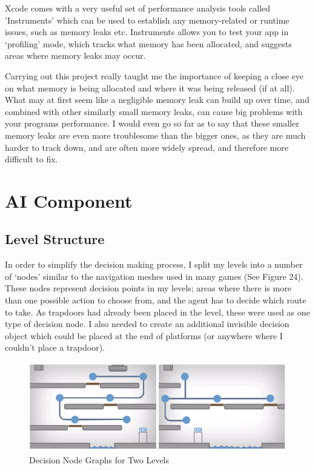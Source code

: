 \documentclass[a4paper,oneside]{report}
\begin{document}
Xcode comes with a very useful set of performance analysis tools called 'Instruments' which can be used to establish any memory-related or runtime issues, such as memory leaks etc. Instruments allows you to test your app in `profiling' mode, which tracks what memory has been allocated, and suggests areas where memory leaks may occur.

Carrying out this project really taught me the importance of keeping a close eye on what memory is being allocated and where it was being released (if at all). What may at first seem like a negligible memory leak can build up over time, and combined with other similarly small memory leaks, can cause big problems with your programs performance. I would even go so far as to say that these smaller memory leaks are even more troublesome than the bigger ones, as they are much harder to track down, and are often more widely spread, and therefore more difficult to fix.

\chapter{AI Component}

\section{Level Structure}

In order to simplify the decision making process, I split my levels into a number of `nodes' similar to the navigation meshes used in many games (See Figure 24). These nodes represent decision points in my levels; areas where there is more than one possible action to choose from, and the agent has to decide which route to take. As trapdoors had already been placed in the level, these were used as one type of decision node. I also needed to create an additional invisible decision object which could be placed at the end of platforms (or anywhere where I couldn't place a trapdoor). 

\begin{figure}[h!]
  \centering
    \includegraphics[width=140mm]{sources/images/LevelNodes}
    \caption{Decision Node Graphs for Two Levels}
\end{figure}
\end{document}
